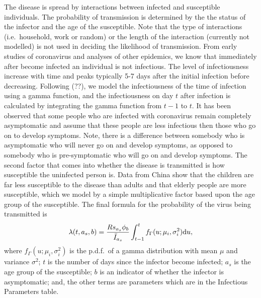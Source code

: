 \documentclass[11pt, oneside]{amsart}   	%
\begin{document}
The disease is spread by interactions between infected and susceptible individuals.
The probability of transmission is determined by the the status of the infector and the age of the susceptible.
Note that the type of interactions (i.e.\ household, work or random) or the length of the interaction (currently not modelled) is not used in deciding the likelihood of transmission.
From early studies of coronavirus and analyses of other epidemics, we know that immediately after become infected an individual is not infectious.
The level of infectiousness increase with time and peaks typically 5-7 days after the initial infection before decreasing.
Following (??), we model the infectiousness of the time of infection using a gamma function, and the infectiousness on day $t$ after infection is calculated by integrating the gamma function from $t-1$ to $t$.
It has been observed that some people who are infected with coronavirus remain completely asymptomatic and assume that these people are less infectious then those who go on to develop symptoms.
Note, there is a difference between somebody who is asymptomatic who will never go on and develop symptoms, as opposed to somebody who is pre-symptomatic who will go on and develop symptoms.
The second factor that comes into whether the disease is transmitted is how susceptible the uninfected person is. 
Data from China show that the children are far less susceptible to the disease than adults and that elderly people are more susceptible, which we model by a simple multiplicative factor based upon the age group of the susceptible.
The final formula for the probability of the virus being transmitted is
\begin{equation}
\lambda(t,a_s,b) = \frac{R s_{a_s}\phi_b}{ \bar I_{a_s}} \int_{t-1}^t f_{\Gamma}(u; \mu_i,\sigma_i^2) {\rm d}u,
\end{equation}
where $f_{\Gamma}(u; \mu_i,\sigma_i^2)$ is the p.d.f.\ of a gamma distribution with mean $\mu$ and variance $\sigma^2$; $t$ is the number of days since the infector become infected; $a_s$ is the age group of the susceptible; $b$ is an indicator of whether the infector is asymptomatic; and, the other terms are parameters which are in the Infectious Parameters table.
\end{document}
